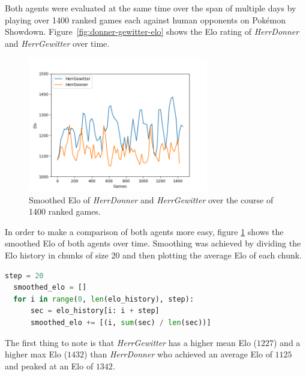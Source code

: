 Both agents were evaluated at the same time over the span of multiple days by playing over 1400 ranked games each 
against human opponents on Pokémon Showdown. Figure~\ref{fig:donner-gewitter-elo} shows the Elo rating of \textit{HerrDonner}
and \textit{HerrGewitter} over time. 
\begin{figure}[h]
	\centering
	\includegraphics[width=0.7\textwidth]{images/Smoothed-Elo-Time.png}
  \captionsetup{justification=centering,margin=1cm}
	\caption{Smoothed Elo of \textit{HerrDonner} and \textit{HerrGewitter} over the course of 1400 ranked games.}
	\label{fig:elo-smoothed}
\end{figure}
In order to make a comparison of both agents more easy, figure \ref{fig:elo-smoothed} shows the smoothed Elo of
both agents over time. Smoothing was achieved by dividing the Elo history in chunks of size 20 and then plotting
the average Elo of each chunk. 
\\\begin{minipage}{\linewidth}
\begin{lstlisting}[language=Python, caption=Smoothing Elo values]
  step = 20
  smoothed_elo = []
  for i in range(0, len(elo_history), step):
      sec = elo_history[i: i + step]
      smoothed_elo += [(i, sum(sec) / len(sec))]
\end{lstlisting}
\end{minipage}
The first thing to note is that \textit{HerrGewitter} has a higher mean Elo ($1227$) and a higher max Elo ($1432$)
than \textit{HerrDonner} who achieved an average Elo of $1125$ and peaked at an Elo of $1342$. 

